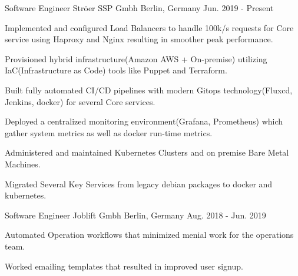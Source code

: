 

\begin{cventries}

  \cventry
    {Software Engineer} %
    {Ströer SSP Gmbh} %
    {Berlin, Germany} %
    {Jun. 2019 - Present} %
    {
      \begin{cvitems} %
        \item {Implemented and configured Load Balancers to handle 100k/s requests for Core service using Haproxy and Nginx resulting in smoother peak performance.}
        \item {Provisioned hybrid infrastructure(Amazon AWS + On-premise) utilizing IaC(Infrastructure as Code) tools like Puppet and Terraform.}
        \item {Built fully automated CI/CD pipelines with modern Gitops technology(Fluxcd, Jenkins, docker) for several Core services.}
        \item {Deployed a centralized monitoring environment(Grafana, Prometheus) which gather system metrics as well as docker run-time metrics.}
        \item {Administered and maintained Kubernetes Clusters and on premise Bare Metal Machines.}
        \item {Migrated Several Key Services from legacy debian packages to docker and kubernetes.}
      \end{cvitems}
    }

  \cventry
    {Software Engineer} %
    {Joblift Gmbh} %
    {Berlin, Germany} %
    {Aug. 2018 - Jun. 2019} %
    {
      \begin{cvitems} %
        \item {Automated Operation workflows that minimized menial work for the operations team.}
        \item {Worked emailing templates that resulted in improved user signup.}
      \end{cvitems}
    }


\end{cventries}
